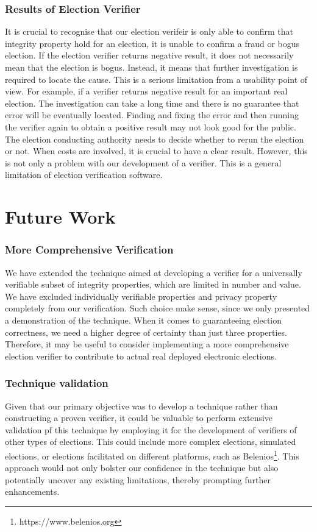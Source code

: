 \subsubsection{Results of Election Verifier}
It is crucial to recognise that our election verifeir is only able to confirm that integrity property hold for an election, it is unable to confirm a fraud or bogus election. If the election verifier returns negative result, it does not necessarily mean that the election is bogus. Instead, it means that further investigation is required to locate the cause. This is a serious limitation from a usability point of view. For example, if a verifier returns negative result for an important real election. The investigation can take a long time and there is no guarantee that error will be eventually located. Finding and fixing the error and then running the verifier again to obtain a positive result may not look good for the public. The election conducting authority needs to decide whether to rerun the election or not. When costs are involved, it is crucial to have a clear result. However, this is not only a problem with our development of a verifier. This is a general limitation of election verification software.

\section{Future Work}
\subsubsection{More Comprehensive Verification}
We have extended the technique aimed at developing a verifier for a universally verifiable subset of integrity properties, which are limited in number and value. We have excluded individually verifiable properties and privacy property completely from our verification. Such choice make sense, since we only presented a demonstration of the technique. When it comes to guaranteeing election correctness, we need a higher degree of certainty than just three properties. Therefore, it may be useful to consider implementing a more comprehensive election verifier to contribute to actual real deployed electronic elections.

\subsubsection{Technique validation}
Given that our primary objective was to develop a technique rather than 
constructing a proven verifier, it could be valuable to perform extensive 
validation pf this technique by employing it for the development of verifiers 
of other types of elections. This could include more complex elections, simulated 
elections, or elections facilitated on different platforms, such as Belenios\footnote{https://www.belenios.org}. This approach would not only bolster our confidence in the technique but also potentially uncover any existing limitations, thereby prompting further enhancements.

